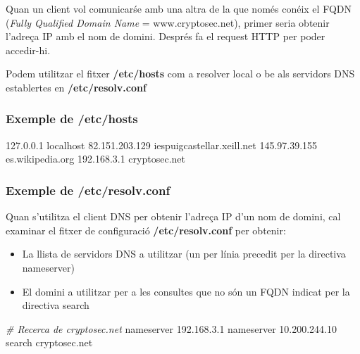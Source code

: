 \documentclass[]{article}
\newenvironment{Shaded}{}{}
\newcommand{\CommentTok}[1]{\textcolor[rgb]{0.38,0.63,0.69}{\textit{#1}}}
\newcommand{\ExtensionTok}[1]{#1}
\newcommand{\NormalTok}[1]{#1}
\begin{document}
Quan un client vol comunicarśe amb una altra de la que només conéix el
FQDN (\emph{Fully Qualified Domain Name} = www.cryptosec.net), primer
seria obtenir l'adreça IP amb el nom de domini. Després fa el request
HTTP per poder accedir-hi.

Podem utilitzar el fitxer \textbf{/etc/hosts} com a resolver local o be
als servidors DNS establertes en \textbf{/etc/resolv.conf}

\hypertarget{exemple-de-etchosts}{%
\subsubsection{\texorpdfstring{\textbf{Exemple de
/etc/hosts}}{Exemple de /etc/hosts}}\label{exemple-de-etchosts}}

\begin{Shaded}
\begin{Highlighting}[]
\ExtensionTok{127.0.0.1}\NormalTok{ localhost }
\ExtensionTok{82.151.203.129}\NormalTok{ iespuigcastellar.xeill.net }
\ExtensionTok{145.97.39.155}\NormalTok{ es.wikipedia.org }
\ExtensionTok{192.168.3.1}\NormalTok{ cryptosec.net}
\end{Highlighting}
\end{Shaded}

\hypertarget{exemple-de-etcresolv.conf}{%
\subsubsection{\texorpdfstring{\textbf{Exemple de
/etc/resolv.conf}}{Exemple de /etc/resolv.conf}}\label{exemple-de-etcresolv.conf}}

Quan s'utilitza el client DNS per obtenir l'adreça IP d'un nom de
domini, cal examinar el fitxer de configuració \textbf{/etc/resolv.conf}
per obtenir:

\begin{itemize}
\item
  La llista de servidors DNS a utilitzar (un per línia precedit per la
  directiva nameserver)
\item
  El domini a utilitzar per a les consultes que no són un FQDN indicat
  per la directiva search
\end{itemize}

\begin{Shaded}
\begin{Highlighting}[]
\CommentTok{# Recerca de cryptosec.net }
\ExtensionTok{nameserver}\NormalTok{ 192.168.3.1}
\ExtensionTok{nameserver}\NormalTok{ 10.200.244.10}
\ExtensionTok{search}\NormalTok{ cryptosec.net}
\end{Highlighting}
\end{Shaded}
\end{document}
